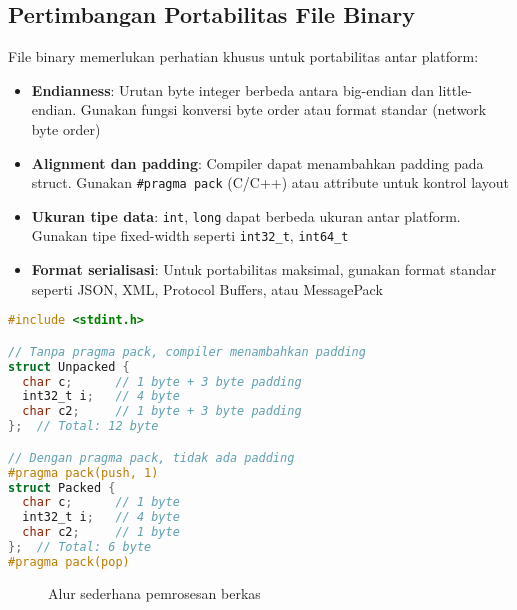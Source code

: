 \documentclass[../main.tex]{subfiles}
\begin{document}
\subsection{Pertimbangan Portabilitas File Binary}

File binary memerlukan perhatian khusus untuk portabilitas antar platform:

\begin{itemize}
  \item \textbf{Endianness}: Urutan byte integer berbeda antara big-endian dan little-endian. Gunakan fungsi konversi byte order atau format standar (network byte order)
  \item \textbf{Alignment dan padding}: Compiler dapat menambahkan padding pada struct. Gunakan \texttt{\#pragma pack} (C/C++) atau attribute untuk kontrol layout
  \item \textbf{Ukuran tipe data}: \texttt{int}, \texttt{long} dapat berbeda ukuran antar platform. Gunakan tipe fixed-width seperti \texttt{int32\_t}, \texttt{int64\_t}
  \item \textbf{Format serialisasi}: Untuk portabilitas maksimal, gunakan format standar seperti JSON, XML, Protocol Buffers, atau MessagePack
\end{itemize}

\begin{lstlisting}[language=C, caption={Contoh struct dengan padding control}]
#include <stdint.h>

// Tanpa pragma pack, compiler menambahkan padding
struct Unpacked {
  char c;      // 1 byte + 3 byte padding
  int32_t i;   // 4 byte
  char c2;     // 1 byte + 3 byte padding
};  // Total: 12 byte

// Dengan pragma pack, tidak ada padding
#pragma pack(push, 1)
struct Packed {
  char c;      // 1 byte
  int32_t i;   // 4 byte
  char c2;     // 1 byte
};  // Total: 6 byte
#pragma pack(pop)
\end{lstlisting}

\begin{figure}[H]
  \centering
  \caption{Alur sederhana pemrosesan berkas}
\end{figure}
\end{document}
